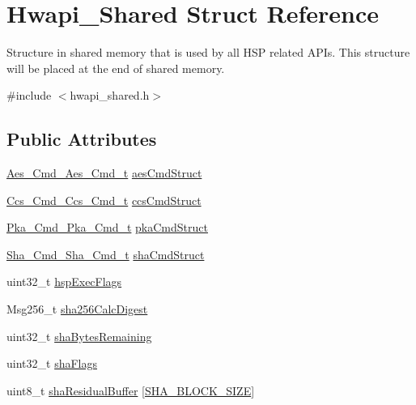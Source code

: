 \hypertarget{structHwapi__Shared}{\section{Hwapi\-\_\-\-Shared Struct Reference}
\label{structHwapi__Shared}
}


Structure in shared memory that is used by all H\-S\-P related A\-P\-Is. This structure will be placed at the end of shared memory.  




{\ttfamily \#include $<$hwapi\-\_\-shared.\-h$>$}

\subsection*{Public Attributes}
\begin{DoxyCompactItemize}
\item 
\hyperlink{struct__Aes__Cmd__Aes__Cmd__t}{Aes\-\_\-\-Cmd\-\_\-\-Aes\-\_\-\-Cmd\-\_\-t} \hyperlink{structHwapi__Shared_a421dabc4084984636e3cf9eb4b921dc1}{aes\-Cmd\-Struct}
\item 
\hyperlink{struct__Ccs__Cmd__Ccs__Cmd__t}{Ccs\-\_\-\-Cmd\-\_\-\-Ccs\-\_\-\-Cmd\-\_\-t} \hyperlink{structHwapi__Shared_a265c08c7109dfb1aca07d1cac2a87601}{ccs\-Cmd\-Struct}
\item 
\hyperlink{struct__Pka__Cmd__Pka__Cmd__t}{Pka\-\_\-\-Cmd\-\_\-\-Pka\-\_\-\-Cmd\-\_\-t} \hyperlink{structHwapi__Shared_a3b016cdb0f49bc77abcb05759a407cfa}{pka\-Cmd\-Struct}
\item 
\hyperlink{struct__Sha__Cmd__Sha__Cmd__t}{Sha\-\_\-\-Cmd\-\_\-\-Sha\-\_\-\-Cmd\-\_\-t} \hyperlink{structHwapi__Shared_ae1de50602efac5a048bc583dd0d421a5}{sha\-Cmd\-Struct}
\item 
uint32\-\_\-t \hyperlink{structHwapi__Shared_a82519fcf08ae4d8d15aecfda380f9791}{hsp\-Exec\-Flags}
\item 
Msg256\-\_\-t \hyperlink{structHwapi__Shared_aac6ac13e7b4085e0d320c955f7fbff1b}{sha256\-Calc\-Digest}
\item 
uint32\-\_\-t \hyperlink{structHwapi__Shared_aaf862461fed63c6397f015cf4efc1550}{sha\-Bytes\-Remaining}
\item 
uint32\-\_\-t \hyperlink{structHwapi__Shared_a4daa23a0ce088b8e163bcb52f4938643}{sha\-Flags}
\item 
uint8\-\_\-t \hyperlink{structHwapi__Shared_a932eec08d4c7d1cac7052e9c68e75b7c}{sha\-Residual\-Buffer} \mbox{[}\hyperlink{sha_8h_a7b4bbf50f237712b1e9bcc3283e41199}{S\-H\-A\-\_\-\-B\-L\-O\-C\-K\-\_\-\-S\-I\-Z\-E}\mbox{]}

\end{DoxyCompactItemize}
